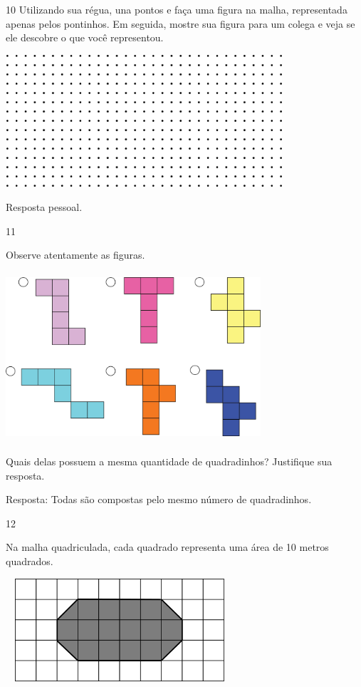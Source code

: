 \num{10} Utilizando sua régua, una pontos e faça uma figura na malha, representada apenas pelos pontinhos. Em seguida, mostre sua
figura para um colega e veja se ele descobre o que você representou.


\includegraphics[width=4.05869in,height=1.93350in]{media/image58.png}

Resposta pessoal.

\num{11}

Observe atentamente as figuras.


\includegraphics[width=3.72532in,height=2.47521in]{media/image59.png}

Quais delas possuem a mesma quantidade de quadradinhos? Justifique sua resposta.


Resposta:
Todas são compostas pelo mesmo número de quadradinhos.

\num{12}

Na malha quadriculada, cada quadrado representa uma área de 10 metros quadrados.


\includegraphics[width=3.33333in,height=1.50517in]{media/image60.png}

